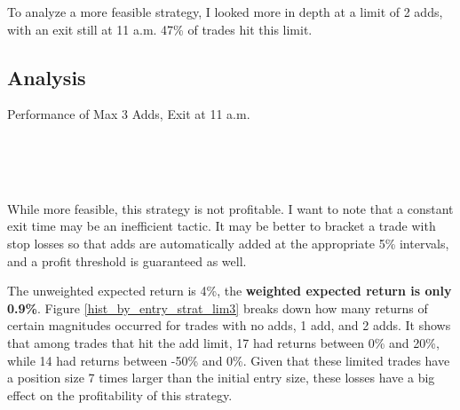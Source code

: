 \documentclass{article}
\begin{document}
To analyze a more feasible strategy, I looked more in depth at a limit of 2 adds, with an exit still at 11 a.m. 47\% of trades hit this limit. 

\subsection{Analysis}

	
\begin{table}
\caption{Performance of Max 3 Adds, Exit at 11 a.m.}
\\[2ex]


\\[2ex]


\\[2ex]

\label{tab_strat_lim3}
\end{table}

While more feasible, this strategy is not profitable. I want to note that a constant exit time may be an inefficient tactic. It may be better to bracket a trade with stop losses so that adds are automatically added at the appropriate 5\% intervals, and a profit threshold is guaranteed as well. 

The unweighted expected return is 4\%, the \textbf{weighted expected return is only 0.9\%}. Figure \ref{hist_by_entry_strat_lim3} breaks down how many returns of certain magnitudes occurred for trades with no adds, 1 add, and 2 adds. It shows that among trades that hit the add limit, 17 had returns between 0\% and 20\%, while 14 had returns between -50\% and 0\%. Given that these limited trades have a position size 7 times larger than the initial entry size, these losses have a big effect on the profitability of this strategy.
\end{document}
